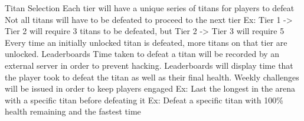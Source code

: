\documentclass[archE1,portrait]{baposter}
\begin{document}
\begin{poster}
{}


{ 
	\begin{outline}
		\1 Titan Selection
			\2 Each tier will have a unique series of titans for players to defeat
			\2 Not all titans will have to be defeated to proceed to the next tier
				\3 Ex: Tier 1 -> Tier 2 will require 3 titans to be defeated, but Tier 2 -> Tier 3 will require 5
			\2 Every time an initially unlocked titan is defeated, more titans on that tier are unlocked.
		\1 Leaderboards
			\2 Time taken to defeat a titan will be recorded by an external server in order to prevent hacking.
			\2 Leaderboards will display time that the player took to defeat the titan as well as their final health.
			\2 Weekly challenges will be issued in order to keep players engaged
				\3 Ex: Last the longest in the arena with a specific titan before defeating it
				\3 Ex: Defeat a specific titan with 100\% health remaining and the fastest time
	\end{outline}
}
\end{poster}
\end{document}
